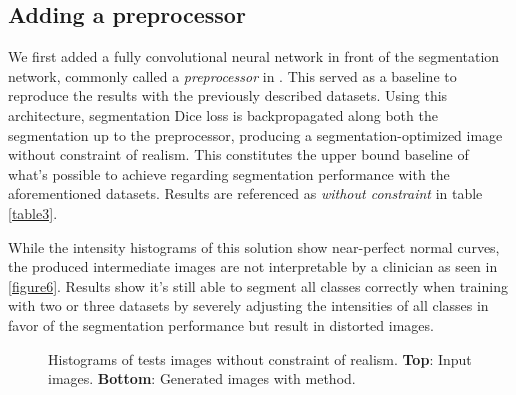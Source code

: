 \documentclass[preprint,12pt]{elsarticle}
\begin{document}
\subsection{Adding a preprocessor}

We first added a fully convolutional neural network in front of the segmentation network, commonly called a \emph{preprocessor} in \cite{Drozdzal}. This served as a baseline to reproduce the results with the previously described datasets. Using this architecture, segmentation Dice loss is backpropagated along both the segmentation up to the preprocessor, producing a segmentation-optimized image without constraint of realism. This constitutes the upper bound baseline of what's possible to achieve regarding segmentation performance with the aforementioned datasets. Results are referenced as \emph{without constraint} in table \ref{table3}.

While the intensity histograms of this solution show near-perfect normal curves, the produced intermediate images are not interpretable by a clinician as seen in \ref{figure6}. Results show it's still able to segment all classes correctly when training with two or three datasets by severely  adjusting the intensities of all classes in favor of the segmentation performance but result in distorted images.

\begin{figure}
\begin{center}
    \begin{footnotesize}
    \end{footnotesize}
    \caption{Histograms of tests images without constraint of realism. \textbf{Top}: Input images. \textbf{Bottom}: Generated images with \cite{Drozdzal} method.}
    \label{figure4}
\end{center}
\end{figure}
\end{document}
